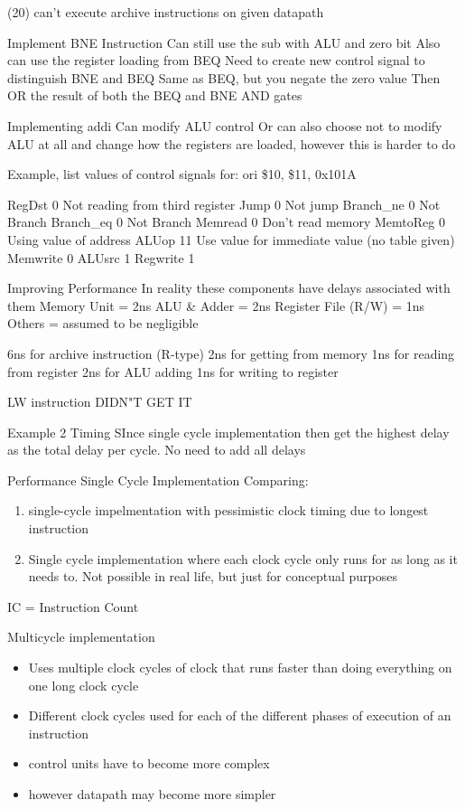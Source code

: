 \documentclass{article}
\begin{document}
		(20) can't execute archive instructions on given datapath 

		Implement BNE Instruction
			Can still use the sub with ALU and zero bit
			Also can use the register loading from BEQ
			Need to create new control signal to distinguish BNE and BEQ
				Same as BEQ, but you negate the zero value
			Then OR the result  of both the BEQ and BNE AND gates

		Implementing addi
			Can modify ALU control
			Or can also choose not to modify ALU at all and change how the registers are loaded, however this is harder to do


		Example, list values of control signals for:   
			ori \$10, \$11, 0x101A

			RegDst		0	Not reading from third register
			Jump		0	Not jump
			Branch\_ne	0	Not Branch
			Branch\_eq	0	Not Branch
			Memread		0	Don't read memory
			MemtoReg	0	Using value of address
			ALUop		11	Use value for immediate value (no table given)
			Memwrite	0
			ALUsrc		1
			Regwrite	1

	Improving Performance
		In reality these components have delays associated with them
		Memory Unit = 2ns
		ALU \& Adder = 2ns
		Register File (R/W) = 1ns
		Others = assumed to be negligible

		6ns for archive instruction (R-type)
			2ns for getting from memory
			1ns for reading from register
			2ns for ALU adding
			1ns for writing to register

		LW instruction
			DIDN"T GET IT

		Example 2
			Timing
				SInce single cycle implementation then get the highest delay as the total delay per cycle. No need to add all delays

		Performance Single Cycle Implementation
			Comparing:
			\begin{enumerate}
				\item single-cycle impelmentation with pessimistic clock timing due to longest instruction
				\item Single cycle implementation where each clock cycle only runs for as long as it needs to. Not possible in real life, but just for conceptual purposes
			\end{enumerate}

			IC = Instruction Count

		Multicycle implementation
		\begin{itemize}
			\item Uses multiple clock cycles of clock that runs faster than doing everything on one long clock cycle
			\item Different clock cycles used for each of the different phases of execution of an instruction
			\item control units have to become more complex
			\item however datapath may become more simpler
		\end{itemize}
\end{document}
